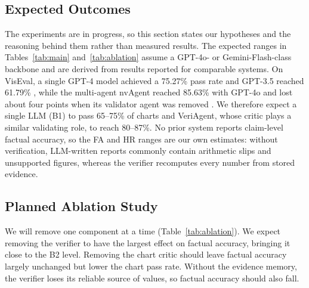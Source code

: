 \documentclass[conference]{IEEEtran}
\begin{document}
\subsection{Expected Outcomes}
The experiments are in progress, so this section states our hypotheses and the reasoning behind them rather than measured results. The expected ranges in Tables~\ref{tab:main} and~\ref{tab:ablation} assume a GPT-4o- or Gemini-Flash-class backbone and are derived from results reported for comparable systems. On VisEval, a single GPT-4 model achieved a 75.27\% pass rate and GPT-3.5 reached 61.79\% \cite{chen2025viseval}, while the multi-agent nvAgent reached 85.63\% with GPT-4o and lost about four points when its validator agent was removed \cite{nvagent2025}. We therefore expect a single LLM (B1) to pass 65--75\% of charts and VeriAgent, whose critic plays a similar validating role, to reach 80--87\%. No prior system reports claim-level factual accuracy, so the FA and HR ranges are our own estimates: without verification, LLM-written reports commonly contain arithmetic slips and unsupported figures, whereas the verifier recomputes every number from stored evidence.

\begin{table}[t]
\centering
\caption{Expected results (hypotheses, not measurements)}
\label{tab:main}
\setlength{\tabcolsep}{3pt}
\end{table}

\subsection{Planned Ablation Study}
We will remove one component at a time (Table~\ref{tab:ablation}). We expect removing the verifier to have the largest effect on factual accuracy, bringing it close to the B2 level. Removing the chart critic should leave factual accuracy largely unchanged but lower the chart pass rate. Without the evidence memory, the verifier loses its reliable source of values, so factual accuracy should also fall.
\end{document}
